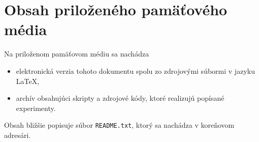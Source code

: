 \chapter{Obsah priloženého pamäťového média} \label{appendix:cd}

Na priloženom pamäťovom médiu sa nachádza

\begin{itemize}
  \item elektronická verzia tohoto dokumentu spolu zo zdrojovými súbormi v jazyku \LaTeX,
  \item archív obsahujúci skripty a zdrojové kódy, ktoré realizujú popísané experimenty.
\end{itemize}

\noindent Obsah bližšie popisuje súbor \texttt{README.txt}, ktorý sa nachádza v koreňovom adresári.





